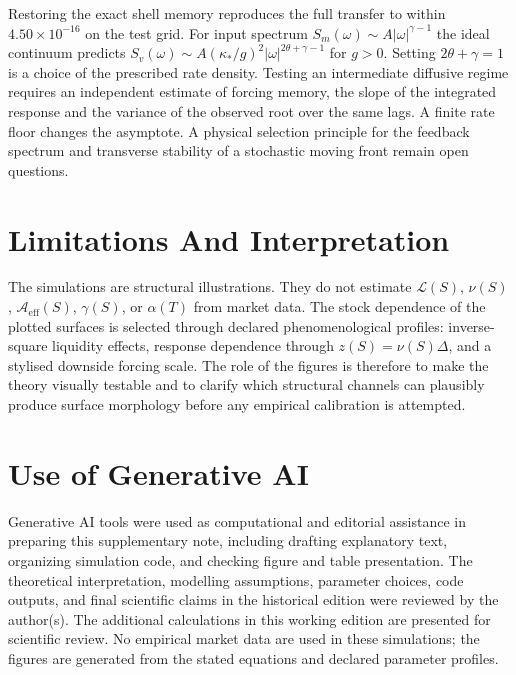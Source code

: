 \documentclass[11pt]{article}
\newcommand{\Aeff}{\mathcal A_{\mathrm{eff}}}
\newcommand{\Liq}{\mathcal L}
\begin{document}
Restoring the exact shell memory reproduces the full transfer to within
\(4.50\times10^{-16}\) on the test grid. For input spectrum
\(S_m(\omega)\sim A|\omega|^{\gamma-1}\) the ideal continuum predicts
\(S_v(\omega)\sim A(\kappa_*/g)^2|\omega|^{2\theta+\gamma-1}\) for
\(g>0\). Setting \(2\theta+\gamma=1\) is a choice of the prescribed
rate density. Testing an intermediate diffusive regime requires an
independent estimate of forcing memory, the slope of the integrated
response and the variance of the observed root over the same lags. A
finite rate floor changes the asymptote. A physical selection principle
for the feedback spectrum and transverse stability of a stochastic moving
front remain open questions.

\section{Limitations And Interpretation}

The simulations are structural illustrations. They do not estimate
\(\Liq(S)\), \(\nu(S)\), \(\Aeff(S)\), \(\gamma(S)\), or \(\alpha(T)\) from
market data. The stock dependence of the plotted surfaces is selected through
declared phenomenological profiles: inverse-square liquidity effects,
response dependence through \(z(S)=\nu(S)\Delta\), and a stylised downside
forcing scale. The role of the figures is therefore to make the theory
visually testable and to clarify which structural channels can plausibly
produce surface morphology before any empirical calibration is attempted.

\section*{Use of Generative AI}

Generative AI tools were used as computational and editorial assistance in
preparing this supplementary note, including drafting explanatory text,
organizing simulation code, and checking figure and table presentation. The
theoretical interpretation, modelling assumptions, parameter choices, code
outputs, and final scientific claims in the historical edition were reviewed by the author(s). The additional calculations in this working edition are presented for scientific review. No empirical market data are used in
these simulations; the figures are generated from the stated equations and
declared parameter profiles.
\end{document}

